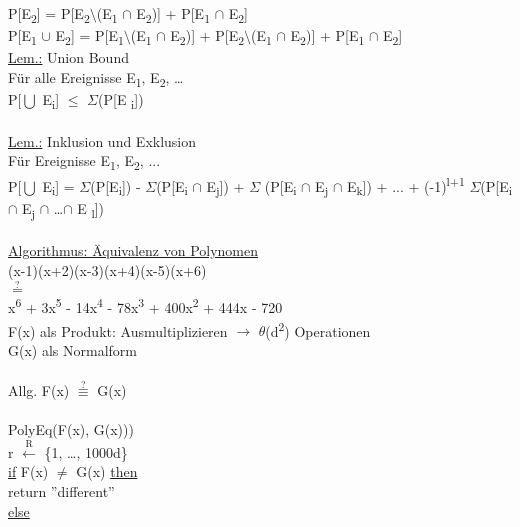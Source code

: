 \documentclass{article}
\begin{document}
 P[E\textsubscript{2}] = P[E\textsubscript{2}$\setminus$(E\textsubscript{1} $\cap$ E\textsubscript{2})] + P[E\textsubscript{1} $\cap$ E\textsubscript{2}] \\
 P[E\textsubscript{1} $\cup$ E\textsubscript{2}] = P[E\textsubscript{1}$\setminus$(E\textsubscript{1} $\cap$ E\textsubscript{2})] + P[E\textsubscript{2}$\setminus$(E\textsubscript{1} $\cap$ E\textsubscript{2})] + P[E\textsubscript{1} $\cap$ E\textsubscript{2}]
 \\
 \underline{Lem.:} Union Bound \\
 F\"ur alle Ereignisse E\textsubscript{1}, E\textsubscript{2}, \ldots \\
 P[$\bigcup$ E\textsubscript{i}] $\le$ $\Sigma$(P[E					\textsubscript{i}]) \\
 \\
 \underline{Lem.:} Inklusion und Exklusion \\
 F\"ur Ereignisse E\textsubscript{1}, E\textsubscript{2}, ...\\
 P[$\bigcup$ E\textsubscript{i}] = $\Sigma$(P[E\textsubscript{i}]) - $\Sigma$(P[E\textsubscript{i} $\cap$ E\textsubscript{j}]) + $\Sigma$		(P[E\textsubscript{i} $\cap$ E\textsubscript{j} $\cap$ E\textsubscript{k}]) + ... + (-1)\textsuperscript{l+1} $\Sigma$(P[E\textsubscript{i} $\cap$ E\textsubscript{j} $\cap$ \ldots $\cap$ E		\textsubscript{l}]) \\
 \\
 \underline{Algorithmus: \"Aquivalenz von Polynomen} \\
 (x-1)(x+2)(x-3)(x+4)(x-5)(x+6) \\
 $\stackrel{\mathrm{?}}=$ \\
 x\textsuperscript{6} + 3x\textsuperscript{5} - 14x\textsuperscript{4} - 78x\textsuperscript{3} + 400x\textsuperscript{2} + 444x - 720 \\
 F(x) als Produkt: Ausmultiplizieren $\to$ $\theta$(d\textsuperscript{2}) 	Operationen \\
 G(x) als Normalform \\
 \\
 Allg. F(x) $\stackrel{\mathrm{?}}\equiv$ G(x) \\
 \\
 PolyEq(F(x), G(x))) \\
 r $\stackrel{\mathrm{R}}\leftarrow$ \{1, \ldots, 1000d\} \\
 \underline{if} F(x) $\neq$ G(x) \underline{then} \\
 return ''different'' \\
 \underline{else} \\
\end{document}

